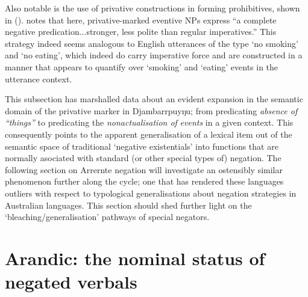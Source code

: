 \documentclass[usenames,dvipsnames,11pt]{article}
\begin{document}
{Also notable is the use of privative constructions in forming prohibitives, shown in (). \citet[446]{Wilkinson1991} notes that here, privative-marked eventive NPs express ``a complete negative predication...stronger, less polite than regular imperatives.'' This strategy indeed seems analogous to English utterances of the type `no smoking' and `no eating', which indeed do carry imperative force and are constructed in a manner that appears to quantify over `smoking' and `eating' events in the utterance context.

This subsection has marshalled data about an evident expansion in the semantic domain of the privative marker in Djambarrpuyŋu; from predicating\textit{ absence of ``things''} to predicating the \textit{nonactualisation of }\textit{events} in a given context. This consequently points to the apparent generalisation of a lexical item out of the semantic space of traditional `negative existentials' into functions that are normally asociated with standard (or other special types of) negation. The following section on Arrernte negation will investigate an ostensibly similar phenomenon further along the cycle; one that has rendered these languages outliers with respect to typological generalisations about negation strategies in Australian languages. This section should shed further light on the `bleaching/generalisation' pathways of special negators.


\section{Arandic: the nominal status of negated verbals}\label{ar}



}
\end{document}
